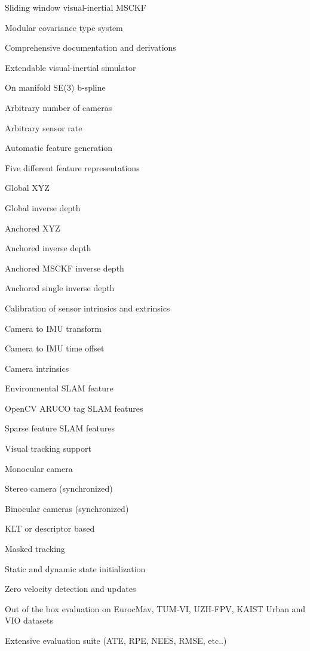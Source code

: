 \begin{DoxyItemize}
\item Sliding window visual-\/inertial M\+S\+C\+KF
\item Modular covariance type system
\item Comprehensive documentation and derivations
\item Extendable visual-\/inertial simulator
\begin{DoxyItemize}
\item On manifold S\+E(3) b-\/spline
\item Arbitrary number of cameras
\item Arbitrary sensor rate
\item Automatic feature generation
\end{DoxyItemize}
\item Five different feature representations
\begin{DoxyEnumerate}
\item Global X\+YZ
\item Global inverse depth
\item Anchored X\+YZ
\item Anchored inverse depth
\item Anchored M\+S\+C\+KF inverse depth
\item Anchored single inverse depth
\end{DoxyEnumerate}
\item Calibration of sensor intrinsics and extrinsics
\begin{DoxyItemize}
\item Camera to I\+MU transform
\item Camera to I\+MU time offset
\item Camera intrinsics
\end{DoxyItemize}
\item Environmental S\+L\+AM feature
\begin{DoxyItemize}
\item Open\+CV A\+R\+U\+CO tag S\+L\+AM features
\item Sparse feature S\+L\+AM features
\end{DoxyItemize}
\item Visual tracking support
\begin{DoxyItemize}
\item Monocular camera
\item Stereo camera (synchronized)
\item Binocular cameras (synchronized)
\item K\+LT or descriptor based
\item Masked tracking
\end{DoxyItemize}
\item Static and dynamic state initialization
\item Zero velocity detection and updates
\item Out of the box evaluation on Euroc\+Mav, T\+U\+M-\/\+VI, U\+Z\+H-\/\+F\+PV, K\+A\+I\+ST Urban and V\+IO datasets
\item Extensive evaluation suite (A\+TE, R\+PE, N\+E\+ES, R\+M\+SE, etc..)
\end{DoxyItemize}

